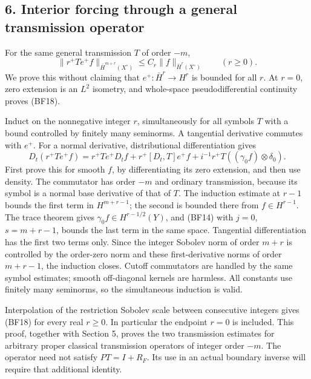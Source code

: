 \documentclass[
  11pt,
]{article}
\makeatletter
\let\ReaderOriginalAnchorStart\hyper@anchorstart
\let\ReaderOriginalAnchorEnd\hyper@anchorend
\let\ReaderPendingAliases\@empty
\def\ReaderArmAliases#1{\gdef\ReaderPendingAliases{#1}}
\def\hyper@anchorstart#1{\ReaderIfNativeAnchorTF{#1}{\ReaderPendingAliases\global\let\ReaderPendingAliases\@empty}{}\ReaderOriginalAnchorStart{#1}}
\makeatother
\begin{document}
\subsection{6. Interior forcing through a general transmission
operator}\label{interior-forcing-through-a-general-transmission-operator}

For the same general transmission \(T\) of order \(-m\), \[
 \|r^+Te^+f\|_{\bar H^{m+r}(X^\circ)}
 \leq C_r\|f\|_{\bar H^r(X^\circ)}\qquad(r\geq0).
 \tag{BF18}
\] We prove this without claiming that \(e^+:\bar H^r\to H^r\) is
bounded for all \(r\). At \(r=0\), zero extension is an \(L^2\)
isometry, and whole-space pseudodifferential continuity proves (BF18).

Induct on the nonnegative integer \(r\), simultaneously for all symbols
\(T\) with a bound controlled by finitely many seminorms. A tangential
derivative commutes with \(e^+\). For a normal derivative,
distributional differentiation gives \[
 D_t(r^+Te^+f)=r^+Te^+D_tf+r^+[D_t,T]e^+f
                  +i^{-1}r^+T((\gamma_0 f)\otimes\delta_0).
 \tag{BF19}
\] First prove this for smooth \(f\), by differentiating its zero
extension, and then use density. The commutator has order \(-m\) and
ordinary transmission, because its symbol is a normal base derivative of
that of \(T\). The induction estimate at \(r-1\) bounds the first term
in \(H^{m+r-1}\); the second is bounded there from \(f\in H^{r-1}\). The
trace theorem gives \(\gamma_0f\in H^{r-1/2}(Y)\), and (BF14) with
\(j=0\), \(s=m+r-1\), bounds the last term in the same space. Tangential
differentiation has the first two terms only. Since the integer Sobolev
norm of order \(m+r\) is controlled by the order-zero norm and these
first-derivative norms of order \(m+r-1\), the induction closes. Cutoff
commutators are handled by the same symbol estimates; smooth
off-diagonal kernels are harmless. All constants use finitely many
seminorms, so the simultaneous induction is valid.

Interpolation of the restriction Sobolev scale between consecutive
integers gives (BF18) for every real \(r\geq0\). In particular the
endpoint \(r=0\) is included. This proof, together with Section 5,
proves the two transmission estimates for arbitrary proper classical
transmission operators of integer order \(-m\). The operator need not
satisfy \(PT=I+R_F\). Its use in an actual boundary inverse will require
that additional identity.

\ReaderArmAliases{\ReaderOriginalAnchorStart{AN03-GFB-007}\ReaderOriginalAnchorEnd\begingroup\expandafter\def\csname @currentHref\endcsname{AN03-GFB-007}\label{AN03-GFB-007}\endgroup\ReaderOriginalAnchorStart{an03-gfb-007-the-boundary-source-and-its-anisotropic-norm}\ReaderOriginalAnchorEnd\begingroup\expandafter\def\csname @currentHref\endcsname{an03-gfb-007-the-boundary-source-and-its-anisotropic-norm}\label{an03-gfb-007-the-boundary-source-and-its-anisotropic-norm}\endgroup\ReaderOriginalAnchorStart{7-the-boundary-source-and-its-anisotropic-norm}\ReaderOriginalAnchorEnd\begingroup\expandafter\def\csname @currentHref\endcsname{7-the-boundary-source-and-its-anisotropic-norm}\label{7-the-boundary-source-and-its-anisotropic-norm}\endgroup\ReaderOriginalAnchorStart{the-boundary-source-and-its-anisotropic-norm}\ReaderOriginalAnchorEnd}
\end{document}
